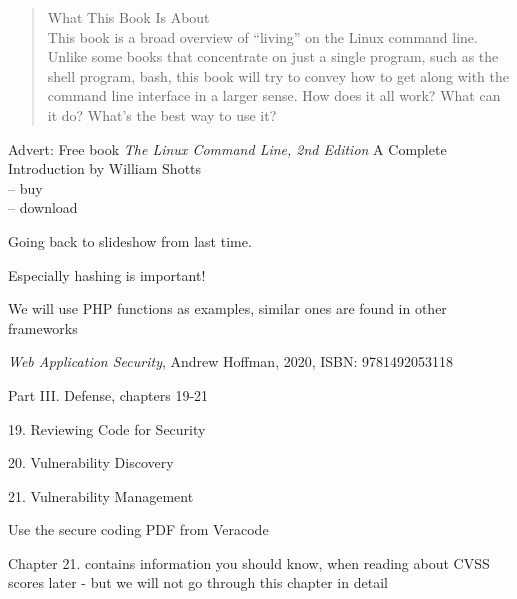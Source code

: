 \documentclass[Screen16to9,17pt]{foils}
\begin{document}


\begin{quote}
{\Large What This Book Is About}\\
This book is a broad overview of “living” on the Linux command line. Unlike some
books that concentrate on just a single program, such as the shell program, bash, this
book will try to convey how to get along with the command line interface in a larger
sense. How does it all work? What can it do? What's the best way to use it?
\end{quote}

Advert: Free book \emph{The Linux Command Line, 2nd Edition}
A Complete Introduction by William Shotts\\
 -- buy\\
 -- download



\begin{quote}
\end{quote}

\begin{list2}
\item Going back to slideshow from last time.
\item Especially hashing is important!
\item We will use PHP functions as examples, similar ones are found in other frameworks
\end{list2}




\emph{Web Application Security}, Andrew Hoffman, 2020, ISBN: 9781492053118

\begin{list1}
\item Part III. Defense, chapters 19-21
\item 19. Reviewing Code for Security
\item 20. Vulnerability Discovery
\item 21. Vulnerability Management
\item Use the secure coding PDF from Veracode
\end{list1}

Chapter 21. contains information you should know, when reading about CVSS scores later - but we will not go through this chapter in detail
\end{document}
